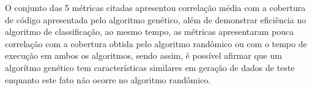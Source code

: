 \documentclass[
	12pt,				%
	oneside,			%
	a4paper,			%
	english,			%
	brazil				%
	]{abntex2ppgsi}
\begin{document}
O conjunto das 5 métricas citadas apresentou correlação média com a cobertura de código apresentada pelo algoritmo genético, além de demonstrar eficiência no algoritmo de classificação, ao mesmo tempo,  as métricas apresentaram pouca correlação com a cobertura obtida pelo algoritmo randômico ou com o tempo de execução em ambos os algoritmos, sendo assim, é possível afirmar que um algorítmo genético tem características similares em geração de dados de teste enquanto este fato não ocorre no algoritmo randômico. \\


\\





\postextual



%
%


\begin{apendicesenv}


%
%
%




\end{apendicesenv}
\end{document}
